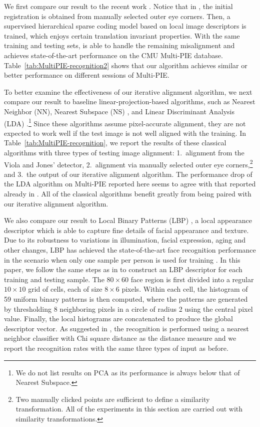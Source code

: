 \documentclass[10pt,journal,letterpaper,compsoc]{IEEEtran}
\begin{document}
We first compare our result to the recent work
\cite{Yang2010-CVPR}. Notice that in \cite{Yang2010-CVPR}, the
initial registration is obtained from manually selected outer
eye corners. Then, a supervised hierarchical sparse coding
model based on local image descriptors is trained, which enjoys
certain translation invariant properties. With the same
training and testing sets, \cite{Yang2010-CVPR} is able to
handle the remaining misalignment and achieves state-of-the-art
performance on the CMU Multi-PIE database.
Table~\ref{tab:MultiPIE-recognition2} shows that our algorithm
achieves similar or better performance on different sessions of
Multi-PIE.

To better examine the effectiveness of our iterative alignment
algorithm, we next compare our result to baseline
linear-projection-based algorithms, such as Nearest Neighbor
(NN), Nearest Subspace (NS) \cite{Lee2005-PAMI}, and Linear
Discriminant Analysis (LDA)
\cite{Belhumeur1997-PAMI}.\footnote{We do not list results on
PCA \cite{Turk1991-CVPR} as its performance is always below
that of Nearest Subspace.} Since these algorithms assume
pixel-accurate alignment, they are not expected to work well if
the test image is not well aligned with the training. In
Table~\ref{tab:MultiPIE-recognition}, we report the results of
these classical algorithms with three types of testing image
alignment: 1.\ alignment from the Viola and Jones' detector,
2.\ alignment via manually selected outer eye
corners,\footnote{Two manually clicked points are sufficient to
define a similarity transformation. All of the experiments in
this section are carried out with similarity transformations.}
and 3.\ the output of our iterative alignment algorithm. The
performance drop of the LDA algorithm on Multi-PIE reported
here seems to agree with that reported already in
\cite{Gross2008-FGR}.  All of the classical algorithms benefit
greatly from being paired with our iterative alignment
algorithm.

We also compare our result to Local Binary Patterns (LBP)
\cite{Ahonen2006-PAMI}, a local appearance descriptor which is
able to capture fine details of facial appearance and texture.
Due to its robustness to variations in illumination, facial
expression, aging and other changes, LBP has achieved the
state-of-the-art face recognition performance in the scenario
when only one sample per person is used for training
\cite{Tan06facerecognition}. In this paper, we follow the same
steps as in \cite{Ahonen2006-PAMI} to construct an LBP
descriptor for each training and testing sample. The $80\times
60$ face region is first divided into a regular $10\times 10$
grid of cells, each of size $8\times 6$ pixels. Within each
cell, the histogram of 59 uniform binary patterns is then
computed, where the patterns are generated by thresholding 8
neighboring pixels in a circle of radius 2 using the central
pixel value. Finally, the local histograms are concatenated to
produce the global descriptor vector. As suggested in
\cite{Ahonen2006-PAMI}, the recognition is performed using a
nearest neighbor classifier with Chi square distance as the
distance measure and we report the recognition rates with the
same three types of input as before.
\end{document}
